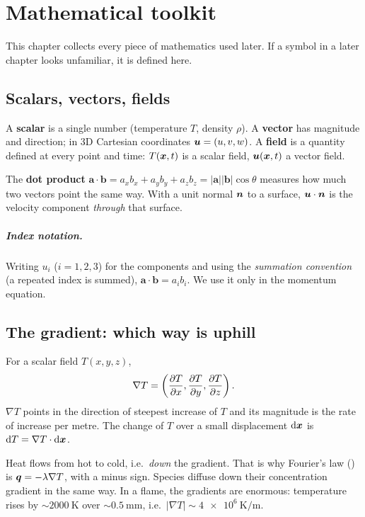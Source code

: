 \chapter{Mathematical toolkit}
\label{ch:math}

This chapter collects every piece of mathematics used later. If a symbol in a later chapter looks
unfamiliar, it is defined here.

\section{Scalars, vectors, fields}

A \textbf{scalar} is a single number (temperature $T$, density $\rho$). A \textbf{vector} has
magnitude and direction; in 3D Cartesian coordinates $\bm{u}=(u,v,w)$. A \textbf{field} is a quantity
defined at every point and time: $T(\bm{x},t)$ is a scalar field, $\bm{u}(\bm{x},t)$ a vector field.

The \textbf{dot product} $\bm a\cdot\bm b = a_x b_x + a_y b_y + a_z b_z = |\bm a||\bm b|\cos\theta$
measures how much two vectors point the same way. With a unit normal $\bm{n}$ to a surface,
$\bm{u}\cdot\bm{n}$ is the velocity component \emph{through} that surface.

\paragraph{Index notation.} Writing $u_i$ ($i=1,2,3$) for the components and using the
\emph{summation convention} (a repeated index is summed), $\bm a\cdot \bm b = a_i b_i$. We use it
only in the momentum equation.

\section{The gradient: which way is uphill}

For a scalar field $T(x,y,z)$,
\begin{equation}
  \nabla T = \left(\frac{\partial T}{\partial x},\frac{\partial T}{\partial y},\frac{\partial T}{\partial z}\right).
\end{equation}
$\nabla T$ points in the direction of steepest increase of $T$ and its magnitude is the rate of
increase per metre. The change of $T$ over a small displacement $\mathrm{d}\bm{x}$ is
$\mathrm{d} T = \nabla T\cdot \mathrm{d} \bm{x}$.

\begin{intuition}
Heat flows from hot to cold, i.e.\ \emph{down} the gradient. That is why Fourier's law
() is $\bm{q} = -\lambda\nabla T$, with a minus sign. Species diffuse down their
concentration gradient in the same way. In a flame, the gradients are enormous: temperature rises by
$\sim\SI{2000}{\kelvin}$ over $\sim\SI{0.5}{\milli\metre}$, i.e.\ $|\nabla T|\sim\SI{4e6}{\kelvin\per\metre}$.
\end{intuition}

